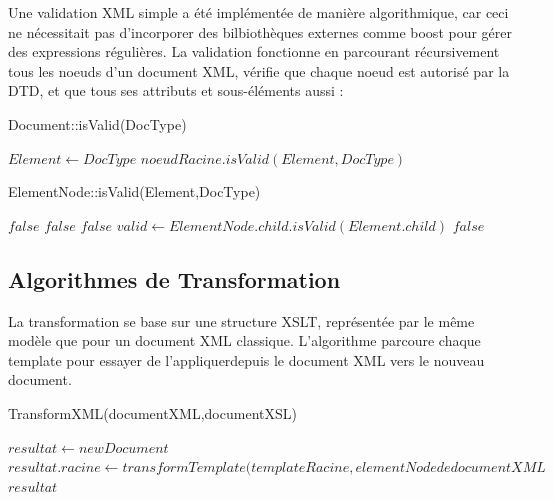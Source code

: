 Une validation XML simple a été implémentée de manière algorithmique, car ceci ne nécessitait pas d'incorporer des bilbiothèques externes comme boost pour gérer des expressions régulières. La validation fonctionne en parcourant récursivement tous les noeuds d'un document XML, vérifie que chaque noeud est autorisé par la DTD, et que tous ses attributs et sous-éléments aussi :

\begin{algorithm}
\caption{Document::isValid(DocType)}
\begin{algorithmic}
\STATE $Element \leftarrow DocType$
\RETURN $noeudRacine.isValid(Element,DocType)$
\end{algorithmic}
\end{algorithm}

\begin{algorithm}
\caption{ElementNode::isValid(Element,DocType)}
\begin{algorithmic}
\RETURN $false$
\ENDIF
{}
\RETURN $false$
\ENDIF
\ENDFOR
{}
\RETURN $false$
\ENDIF
\STATE $valid \leftarrow ElementNode.child.isValid(Element.child)$
\RETURN $false$
\ENDIF
\ENDFOR
\end{algorithmic}
\end{algorithm}


\newpage
\subsection{Algorithmes de Transformation}

La transformation se base sur une structure XSLT, représentée par le même modèle que pour un document XML classique. L'algorithme parcoure chaque template pour essayer de l'appliquerdepuis le document XML vers le nouveau document.

\begin{algorithm}
\caption{TransformXML(documentXML,documentXSL)}
\begin{algorithmic}
\STATE $resultat \leftarrow new Document$
\STATE $resultat.racine \leftarrow transformTemplate(templateRacine,elementNode de documentXML$
\ENDIF
\ENDFOR
\RETURN $resultat$
\end{algorithmic}
\end{algorithm}

